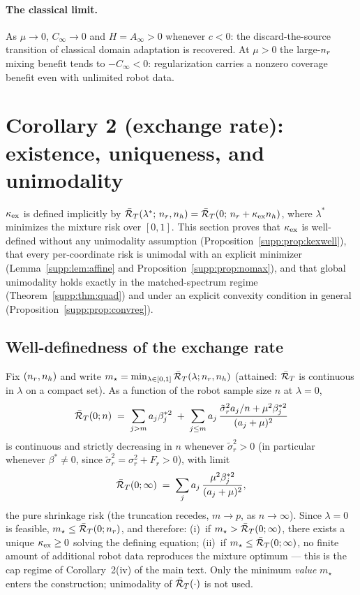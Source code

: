\paragraph{The classical limit.}
As $\mu \to 0$, $C_\infty \to 0$ and $H = A_\infty > 0$ whenever $c < 0$: the discard-the-source transition of classical domain adaptation is recovered.
At $\mu > 0$ the large-$n_r$ mixing benefit tends to $-C_\infty < 0$: regularization carries a nonzero coverage benefit even with unlimited robot data.

\section{Corollary 2 (exchange rate): existence, uniqueness, and unimodality}
\label{supp:t2}

$\kappa_{\mathrm{ex}}$ is defined implicitly by $\bar{\mathcal{R}}_T(\lambda^*;\, n_r, n_h) = \bar{\mathcal{R}}_T(0;\, n_r + \kappa_{\mathrm{ex}}n_h)$, where $\lambda^*$ minimizes the mixture risk over $[0,1]$.
This section proves that $\kappa_{\mathrm{ex}}$ is well-defined without any unimodality assumption (Proposition~\ref{supp:prop:kexwell}), that every per-coordinate risk is unimodal with an explicit minimizer (Lemma~\ref{supp:lem:affine} and Proposition~\ref{supp:prop:nomax}), and that global unimodality holds exactly in the matched-spectrum regime (Theorem~\ref{supp:thm:quad}) and under an explicit convexity condition in general (Proposition~\ref{supp:prop:convreg}).

\subsection{Well-definedness of the exchange rate}

\begin{proposition}\label{supp:prop:kexwell}
Fix $(n_r, n_h)$ and write $m_\star = \min_{\lambda \in [0,1]} \bar{\mathcal{R}}_T(\lambda; n_r, n_h)$ (attained: $\bar{\mathcal{R}}_T$ is continuous in $\lambda$ on a compact set).
As a function of the robot sample size $n$ at $\lambda = 0$,
\begin{equation}
\bar{\mathcal{R}}_T(0; n) \;=\; \sum_{j > m} a_j \beta_j^{*2} \;+\; \sum_{j \le m} a_j\, \frac{\tilde\sigma_r^2 a_j / n + \mu^2 \beta_j^{*2}}{(a_j + \mu)^2}
\end{equation}
is continuous and strictly decreasing in $n$ whenever $\tilde\sigma_r^2 > 0$ (in particular whenever $\beta^* \neq 0$, since $\tilde\sigma_r^2 = \sigma_r^2 + F_r > 0$), with limit
\begin{equation}
\bar{\mathcal{R}}_T(0; \infty) \;=\; \sum_{j} a_j\, \frac{\mu^2 \beta_j^{*2}}{(a_j + \mu)^2},
\end{equation}
the pure shrinkage risk (the truncation recedes, $m \to p$, as $n \to \infty$).
Since $\lambda = 0$ is feasible, $m_\star \le \bar{\mathcal{R}}_T(0; n_r)$, and therefore:
(i)~if $m_\star > \bar{\mathcal{R}}_T(0; \infty)$, there exists a unique $\kappa_{\mathrm{ex}} \ge 0$ solving the defining equation;
(ii)~if $m_\star \le \bar{\mathcal{R}}_T(0; \infty)$, no finite amount of additional robot data reproduces the mixture optimum --- this is the cap regime of Corollary~2(iv) of the main text.
Only the minimum \emph{value} $m_\star$ enters the construction; unimodality of $\bar{\mathcal{R}}_T(\cdot)$ is not used.
\end{proposition}

